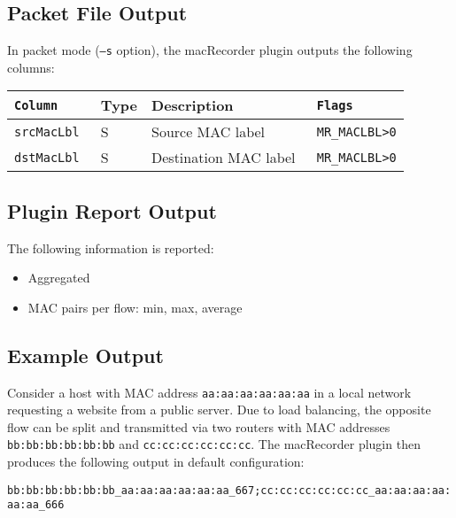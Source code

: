 \documentclass[documentation]{subfiles}
\begin{document}
\subsection{Packet File Output}
In packet mode ({\tt --s} option), the macRecorder plugin outputs the following columns:
\begin{longtable}{>{\tt}lll>{\tt\small}l}
    \toprule
    {\bf Column} & {\bf Type} & {\bf Description} & {\bf Flags}\\
    \midrule\endhead%
    srcMacLbl & S & Source MAC label             & MR\_MACLBL>0\\
    dstMacLbl & S & Destination MAC label        & MR\_MACLBL>0\\
    \bottomrule
\end{longtable}

\subsection{Plugin Report Output}
The following information is reported:
\begin{itemize}
    \item Aggregated {\tt{}}
    \item MAC pairs per flow: min, max, average
\end{itemize}

\subsection{Example Output}
Consider a host with MAC address {\tt aa:aa:aa:aa:aa:aa} in a local network requesting a website from a public server. Due to load balancing, the opposite flow can be split and transmitted via two routers with MAC addresses {\tt bb:bb:bb:bb:bb:bb} and {\tt cc:cc:cc:cc:cc:cc}. The macRecorder plugin then produces the following output in default configuration:
\begin{center}
    {\tt bb:bb:bb:bb:bb:bb\_aa:aa:aa:aa:aa:aa\_667;cc:cc:cc:cc:cc:cc\_aa:aa:aa:aa:aa:aa\_666}
\end{center}
\end{document}
